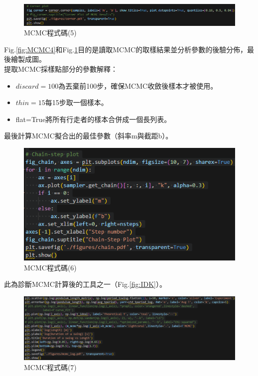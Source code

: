 \documentclass[12pt,a4paper]{article}
\begin{document}
\begin{CJK}{UTF8}{bkai}
\begin{figure}[h]
    \centering
    \includegraphics[width=1\linewidth]{MCMC5.png}
    \caption{MCMC程式碼(5)}
    \label{fig:MCMC5}
\end{figure}
\indent Fig.\ref{fig:MCMC4}和Fig.\ref{fig:MCMC5}目的是讀取MCMC的取樣結果並分析參數的後驗分佈，最後繪製成圖。\\
\indent 提取MCMC採樣點部分的參數解釋：\\
\begin{itemize}
    \item $discard=100$為丟棄前100步，確保MCMC收斂後樣本才被使用。
    \item $thin=15$每15步取一個樣本。
    \item flat=True將所有行走者的樣本合併成一個長列表。
\end{itemize}
\indent 最後計算MCMC擬合出的最佳參數（斜率m與截距b）。

\clearpage

\begin{figure}[h]
    \centering
    \includegraphics[width=1\linewidth]{MCMC6.png}
    \caption{MCMC程式碼(6)}
    \label{fig:MCMC6}
\end{figure}

\indent 此為診斷MCMC計算後的工具之一（Fig.\ref{fig:IDK}）。

\begin{figure}[h]
    \centering
    \includegraphics[width=1\linewidth]{MCMC7.png}
    \caption{MCMC程式碼(7)}
    \label{fig:MCMC7}
\end{figure}


\end{CJK}
\end{document}
